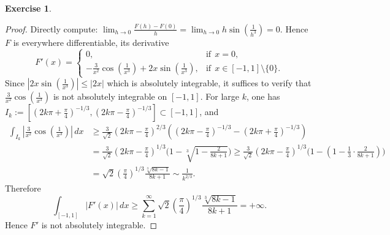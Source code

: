 \documentclass[a4paper]{article}
\newtheorem{ex}{Exercise}[subsection]
\begin{document}
\begin{ex}\end{ex}\begin{proof}
Directly compute: $\lim_{h \to 0} \frac{F(h) - F(0)}{h} = \lim_{h\to 0}h\sin(\frac{1}{h^3}) = 0$. Hence $F$ is 
everywhere differentiable, its derivative$$
F'(x) = \begin{cases}
    0, &\text{if}\ \ x = 0,\\
    -\frac{3}{x^2}\cos(\frac{1}{x^3}) + 2x\sin(\frac{1}{x^3}), &\text{if}\ \ x \in [-1, 1]\setminus\{0\}.
\end{cases}
$$
Since $|2x\sin(\frac{1}{x^3})| \leq |2x|$ which is absolutely integrable, it suffices to verify that 
$\frac{3}{x^2}\cos(\frac{1}{x^3})$ is not absolutely integrable on $[-1,1]$. For large $k$, one has 
$I_k := [(2k\pi + \frac{\pi}{4})^{-1/3}, (2k\pi - \frac{\pi}{4})^{-1/3}] \subset [-1,1]$, and \begin{align*}
\int_{I_k} |\frac{3}{x^2}\cos(\frac{1}{x^3})|\,dx &\geq \frac{3}{\sqrt{2}}(2k\pi- \frac{\pi}{4})^{2/3}
((2k\pi - \frac{\pi}{4})^{-1/3} - (2k\pi + \frac{\pi}{4})^{-1/3})\\
&= \frac{3}{\sqrt{2}}(2k\pi - \frac{\pi}{4})^{1/3}\Bigg(1 - \sqrt[3]{1 - \frac{2}{8k + 1}}\Bigg)
\geq \frac{3}{\sqrt{2}}(2k\pi - \frac{\pi}{4})^{1/3}\Bigg(1 - (1 - \frac{1}{3}\cdot\frac{2}{8k + 1})\Bigg)\\
&= \sqrt{2}(\frac{\pi}{4})^{1/3}\frac{\sqrt[3]{8k-1}}{8k + 1} \sim \frac{1}{k^{2/3}}.
\end{align*}
Therefore $$
\int_{[-1,1]}|F'(x)|\,dx \geq \sum_{k = 1}^\infty \sqrt{2}(\frac{\pi}{4})^{1/3}\frac{\sqrt[3]{8k-1}}{8k + 1} = +\infty.
$$Hence $F'$ is not absolutely integrable.
\end{proof}
\end{document}

